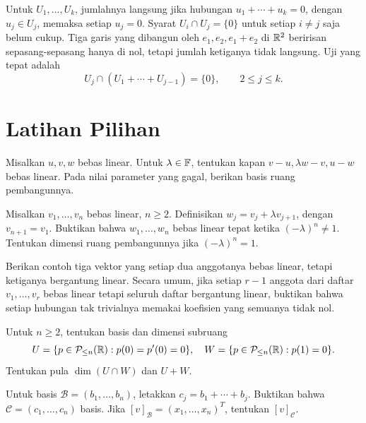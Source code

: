 Untuk $U_1,\ldots,U_k$, jumlahnya langsung jika hubungan
$u_1+\cdots+u_k=0$, dengan $u_j\in U_j$, memaksa setiap $u_j=0$.
Syarat $U_i\cap U_j=\{0\}$ untuk setiap $i\ne j$ saja belum cukup.
Tiga garis yang dibangun oleh $e_1,e_2,e_1+e_2$ di $\mathbb{R}^2$
beririsan sepasang-sepasang hanya di nol, tetapi jumlah ketiganya
tidak langsung. Uji yang tepat adalah
\[
    U_j\cap(U_1+\cdots+U_{j-1})=\{0\},\qquad 2\le j\le k.
\]

\section{Latihan Pilihan}

\begin{latihan}\label{bebas:lat-parameter}
    Misalkan $u,v,w$ bebas linear. Untuk $\lambda\in\mathbb{F}$, tentukan
    kapan $v-u,\lambda w-v,u-w$ bebas linear. Pada nilai parameter
    yang gagal, berikan basis ruang pembangunnya.
\end{latihan}

\begin{latihan}\label{bebas:lat-siklik}
    Misalkan $v_1,\ldots,v_n$ bebas linear, $n\ge2$.
    Definisikan $w_j=v_j+\lambda v_{j+1}$, dengan $v_{n+1}=v_1$.
    Buktikan bahwa $w_1,\ldots,w_n$ bebas linear tepat ketika
    $(-\lambda)^n\ne1$. Tentukan dimensi ruang pembangunnya
    jika $(-\lambda)^n=1$.
\end{latihan}

\begin{latihan}\label{bebas:lat-lokal}
    Berikan contoh tiga vektor yang setiap dua anggotanya bebas
    linear, tetapi ketiganya bergantung linear.
    Secara umum, jika setiap $r-1$ anggota dari daftar
    $v_1,\ldots,v_r$ bebas linear tetapi seluruh daftar bergantung
    linear, buktikan bahwa setiap hubungan tak trivialnya memakai
    koefisien yang semuanya tidak nol.
\end{latihan}

\begin{latihan}\label{bebas:lat-polinom}
    Untuk $n\ge2$, tentukan basis dan dimensi subruang
    \[
        U=\{p\in\mathcal P_{\le n}(\mathbb{R}):p(0)=p'(0)=0\},
        \quad
        W=\{p\in\mathcal P_{\le n}(\mathbb{R}):p(1)=0\}.
    \]
    Tentukan pula $\dim(U\cap W)$ dan $U+W$.
\end{latihan}

\begin{latihan}\label{bebas:lat-koordinat}
    Untuk basis $\mathcal B=(b_1,\ldots,b_n)$, letakkan
    $c_j=b_1+\cdots+b_j$. Buktikan bahwa
    $\mathcal C=(c_1,\ldots,c_n)$ basis.
    Jika $[v]_{\mathcal B}=(x_1,\ldots,x_n)^T$, tentukan
    $[v]_{\mathcal C}$.
\end{latihan}

